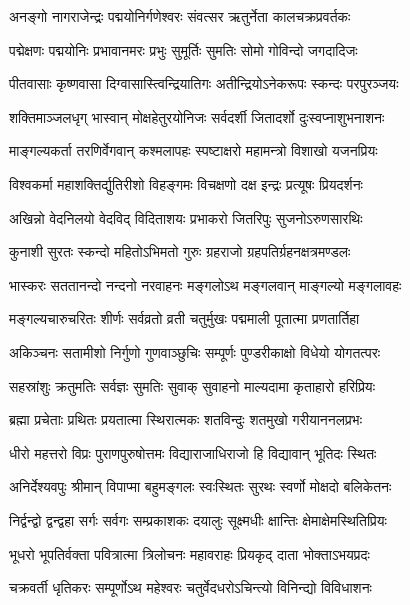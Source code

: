 \twolineshloka
{अनङ्गो नागराजेन्द्रः पद्मयोनिर्गणेश्वरः}
{संवत्सर ऋतुर्नेता कालचक्रप्रवर्तकः}%

\twolineshloka
{पद्मेक्षणः पद्मयोनिः प्रभावानमरः प्रभुः}
{सुमूर्तिः सुमतिः सोमो गोविन्दो जगदादिजः}%

\twolineshloka
{पीतवासाः कृष्णवासा दिग्वासास्त्विन्द्रियातिगः}
{अतीन्द्रियोऽनेकरूपः स्कन्दः परपुरञ्जयः}%

\twolineshloka
{शक्तिमाञ्जलधृग् भास्वान् मोक्षहेतुरयोनिजः}
{सर्वदर्शी  जितादर्शो दुःस्वप्नाशुभनाशनः}%

\twolineshloka
{माङ्गल्यकर्ता तरणिर्वेगवान् कश्मलापहः}
{स्पष्टाक्षरो महामन्त्रो विशाखो यजनप्रियः}%

\twolineshloka
{विश्वकर्मा महाशक्तिर्द्युतिरीशो विहङ्गमः}
{विचक्षणो दक्ष इन्द्रः प्रत्यूषः प्रियदर्शनः}%

\twolineshloka
{अखिन्नो वेदनिलयो वेदविद् विदिताशयः}
{प्रभाकरो जितरिपुः सुजनोऽरुणसारथिः}%

\twolineshloka
{कुनाशी सुरतः स्कन्दो महितोऽभिमतो गुरुः}
{ग्रहराजो ग्रहपतिर्ग्रहनक्षत्रमण्डलः}%

\twolineshloka
{भास्करः सततानन्दो नन्दनो नरवाहनः}
{मङ्गलोऽथ मङ्गलवान् माङ्गल्यो मङ्गलावहः}%

\twolineshloka
{मङ्गल्यचारुचरितः शीर्णः सर्वव्रतो व्रती}
{चतुर्मुखः पद्ममाली पूतात्मा प्रणतार्तिहा}%

\twolineshloka
{अकिञ्चनः सतामीशो निर्गुणो गुणवाञ्छुचिः}
{सम्पूर्णः पुण्डरीकाक्षो विधेयो योगतत्परः}%

\twolineshloka
{सहस्रांशुः क्रतुमतिः सर्वज्ञः सुमतिः सुवाक्}
{सुवाहनो माल्यदामा कृताहारो हरिप्रियः}%

\twolineshloka
{ब्रह्मा प्रचेताः प्रथितः प्रयतात्मा स्थिरात्मकः}
{शतविन्दुः शतमुखो गरीयाननलप्रभः}%

\twolineshloka
{धीरो महत्तरो विप्रः पुराणपुरुषोत्तमः}
{विद्याराजाधिराजो हि विद्यावान् भूतिदः स्थितः}%

\twolineshloka
{अनिर्देश्यवपुः श्रीमान् विपाप्मा बहुमङ्गलः}
{स्वःस्थितः सुरथः स्वर्णो मोक्षदो बलिकेतनः}%

\twolineshloka
{निर्द्वन्द्वो द्वन्द्वहा सर्गः सर्वगः सम्प्रकाशकः}
{दयालुः सूक्ष्मधीः क्षान्तिः क्षेमाक्षेमस्थितिप्रियः}%

\twolineshloka
{भूधरो भूपतिर्वक्ता पवित्रात्मा त्रिलोचनः}
{महावराहः प्रियकृद् दाता भोक्ताऽभयप्रदः}%

\twolineshloka
{चक्रवर्ती धृतिकरः सम्पूर्णोऽथ महेश्वरः}
{चतुर्वेदधरोऽचिन्त्यो विनिन्द्यो विविधाशनः}%

